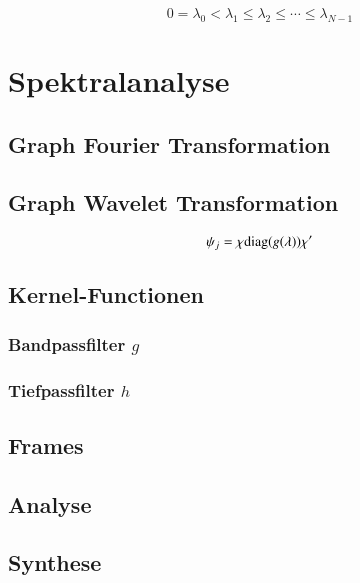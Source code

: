 \begin{refsection}
\begin{equation}
0 = \lambda_0 < \lambda_1 \le \lambda_2 \le \cdots \le \lambda_{N-1}
\end{equation}

\section{Spektralanalyse}

\subsection{Graph Fourier Transformation\label{subsec:sgwt:gft}}

\subsection{Graph Wavelet Transformation\label{subsec:sgwt:gwt}}

\begin{equation}
\psi_j = \chi \diag{g(\lambda)} \chi'
\end{equation}

\subsection{Kernel-Functionen}

\subsubsection{Bandpassfilter \texorpdfstring{$g$}{g}}

\subsubsection{Tiefpassfilter \texorpdfstring{$h$}{h}}

\subsection{Frames}

\subsection{Analyse}

\subsection{Synthese}


\end{refsection}
